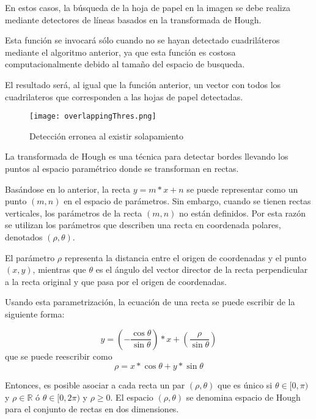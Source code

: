 En estos casos, la búsqueda de la hoja de papel en la imagen se debe realiza mediante detectores de líneas basados en la transformada de Hough.

Esta función se invocará sólo cuando no se hayan detectado cuadriláteros mediante el algoritmo anterior, ya que esta función es costosa computacionalmente debido al tamaño del espacio de busqueda. 

El resultado será, al igual que la función anterior, un vector con todos los cuadrilateros que corresponden a las hojas de papel detectadas.

\begin{figure}[h!] 
  \centering
  \texttt{[image: overlappingThres.png]}
  \caption{Detección erronea al existir solapamiento}
  \label{fig:overlappingThres}
\end{figure}

La transformada de Hough es una técnica para detectar bordes llevando los puntos al espacio paramétrico donde se transforman en rectas.

Basándose en lo anterior, la recta $y = m*x+n$ se puede representar como un punto $(m,n)$ en el espacio de parámetros. Sin embargo, cuando se tienen rectas verticales, los parámetros de la recta $(m,n)$  no están definidos. Por esta razón se utilizan los parámetros que describen una recta en coordenada polares, denotados $(\rho,\theta)$. 

El parámetro $\rho$ representa la distancia entre el origen de coordenadas y el punto$(x,y)$, mientras que $\theta$ es el ángulo del vector director de la recta perpendicular a la recta original y que pasa por el origen de coordenadas.

Usando esta parametrización, la ecuación de una recta se puede escribir de la siguiente forma:

\begin{equation}
y=(-\dfrac{\cos \theta}{\sin \theta}) * x + (\dfrac{\rho}{\sin \theta})
\end{equation}
que se puede reescribir como
\begin{equation}
\rho=x * \cos \theta + y * \sin \theta
\end{equation}

Entonces, es posible asociar a cada recta un par $(\rho,\theta)$ que es único si $\theta \in [0,\pi)$ y $\rho \in \mathbb{R}$ ó $\theta \in [0,2\pi)$ y $\rho \geq 0$. El espacio $(\rho,\theta)$ se denomina espacio de Hough para el conjunto de rectas en dos dimensiones.

